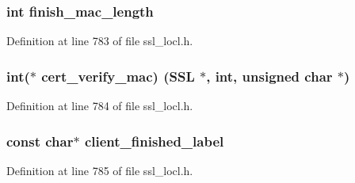 \subsubsection[{\texorpdfstring{finish\+\_\+mac\+\_\+length}{finish_mac_length}}]{\setlength{\rightskip}{0pt plus 5cm}int finish\+\_\+mac\+\_\+length}\hypertarget{structssl3__enc__method_ae19d342ac58a6c75d8ad7b426e36a3ea}{}\label{structssl3__enc__method_ae19d342ac58a6c75d8ad7b426e36a3ea}


Definition at line 783 of file ssl\+\_\+locl.\+h.

\subsubsection[{\texorpdfstring{cert\+\_\+verify\+\_\+mac}{cert_verify_mac}}]{\setlength{\rightskip}{0pt plus 5cm}int($\ast$ cert\+\_\+verify\+\_\+mac) ({\bf S\+SL} $\ast$, int, unsigned char $\ast$)}\hypertarget{structssl3__enc__method_a21c24ac84ea68cb0fa96b4fa27026b34}{}\label{structssl3__enc__method_a21c24ac84ea68cb0fa96b4fa27026b34}


Definition at line 784 of file ssl\+\_\+locl.\+h.

\subsubsection[{\texorpdfstring{client\+\_\+finished\+\_\+label}{client_finished_label}}]{\setlength{\rightskip}{0pt plus 5cm}const char$\ast$ client\+\_\+finished\+\_\+label}\hypertarget{structssl3__enc__method_a48e32e660cde6a4ee9b64dd2f19a1628}{}\label{structssl3__enc__method_a48e32e660cde6a4ee9b64dd2f19a1628}


Definition at line 785 of file ssl\+\_\+locl.\+h.

